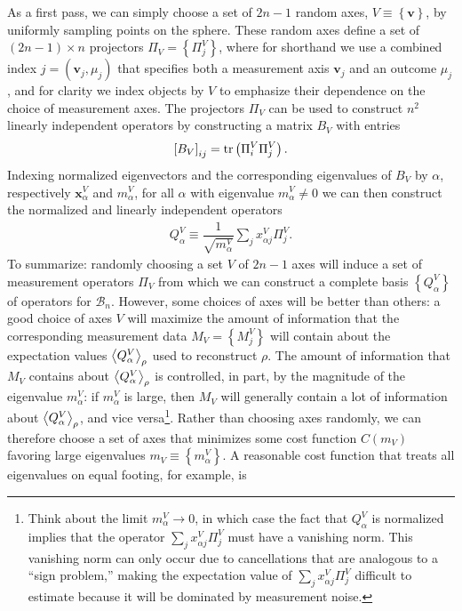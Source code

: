 \documentclass[nofootinbib,notitlepage,11pt]{revtex4-2}
\newcommand{\f}[2]{\dfrac{#1}{#2}} %
\newcommand{\p}[1]{\left(#1\right)} %
\renewcommand{\sp}[1]{\left[#1\right]} %
\renewcommand{\set}[1]{\left\{#1\right\}} %
\newcommand{\bk}{\Braket} %
\renewcommand{\v}{\bm} %
\newcommand{\1}{\mathds{1}}
\newcommand{\B}{\mathcal{B}}
\begin{document}
As a first pass, we can simply choose a set of $2n-1$ random axes, $V\equiv\set{\v v}$, by uniformly sampling points on the sphere.
These random axes define a set of $\p{2n-1}\times n$ projectors $\Pi_V=\set{\Pi^V_j}$, where for shorthand we use a combined index $j=\p{\v v_j,\mu_j}$ that specifies both a measurement axis $\v v_j$ and an outcome $\mu_j$, and for clarity we index objects by $V$ to emphasize their dependence on the choice of measurement axes.
The projectors $\Pi_V$ can be used to construct $n^2$ linearly independent operators by constructing a matrix $B_V$ with entries
\begin{align}
  \sp{B_V}_{ij} = \tr\p{\Pi^V_i \Pi^V_j}.
\end{align}
Indexing normalized eigenvectors and the corresponding eigenvalues of $B_V$ by $\alpha$, respectively $\v x^V_\alpha$ and $m^V_\alpha$, for all $\alpha$ with eigenvalue $m^V_\alpha\ne0$ we can then construct the normalized and linearly independent operators
\begin{align}
  Q^V_\alpha \equiv \f1{\sqrt{m^V_\alpha}} \sum_j x^V_{\alpha j} \Pi^V_j.
\end{align}
To summarize: randomly choosing a set $V$ of $2n-1$ axes will induce a set of measurement operators $\Pi_V$ from which we can construct a complete basis $\set{Q^V_\alpha}$ of operators for $\B_n$.
However, some choices of axes will be better than others: a good choice of axes $V$ will maximize the amount of information that the corresponding measurement data $M_V=\set{M^V_j}$ will contain about the expectation values $\bk{Q^V_\alpha}_\rho$ used to reconstruct $\rho$.
The amount of information that $M_V$ contains about $\bk{Q^V_\alpha}_\rho$ is controlled, in part, by the magnitude of the eigenvalue $m^V_\alpha$: if $m^V_\alpha$ is large, then $M_V$ will generally contain a lot of information about $\bk{Q^V_\alpha}_\rho$, and vice versa\footnote{Think about the limit $m^V_\alpha\to0$, in which case the fact that $Q^V_\alpha$ is normalized implies that the operator $\sum_j x^V_{\alpha j} \Pi^V_j$ must have a vanishing norm.
  This vanishing norm can only occur due to cancellations that are analogous to a ``sign problem,'' making the expectation value of $\sum_j x^V_{\alpha j} \Pi^V_j$ difficult to estimate because it will be dominated by measurement noise.}.
Rather than choosing axes randomly, we can therefore choose a set of axes that minimizes some cost function $C\p{m_V}$ favoring large eigenvalues $m_V\equiv\set{m^V_\alpha}$.
A reasonable cost function that treats all eigenvalues on equal footing, for example, is
\end{document}
